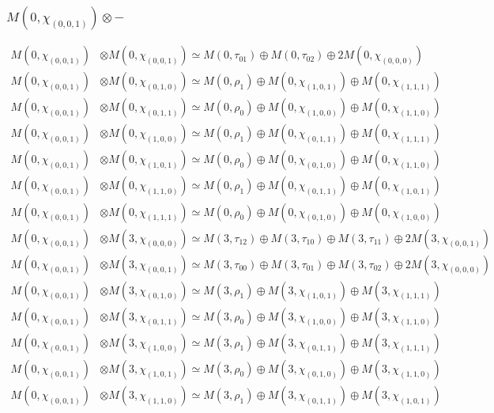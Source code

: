 \subsubsection{$ M(0,\chi_{(0,0,1)})\otimes -$}
\begin{align*}
M(0,\chi_{(0,0,1)}) &\otimes M(0,\chi_{(0,0,1)}) \simeq M(0,\tau_{01}) \oplus M(0,\tau_{02}) \oplus 2 M(0,\chi_{(0,0,0)}) \\
M(0,\chi_{(0,0,1)}) &\otimes M(0,\chi_{(0,1,0)}) \simeq M(0,\rho_{1}) \oplus M(0,\chi_{(1,0,1)}) \oplus M(0,\chi_{(1,1,1)}) \\
M(0,\chi_{(0,0,1)}) &\otimes M(0,\chi_{(0,1,1)}) \simeq M(0,\rho_{0}) \oplus M(0,\chi_{(1,0,0)}) \oplus M(0,\chi_{(1,1,0)}) \\
M(0,\chi_{(0,0,1)}) &\otimes M(0,\chi_{(1,0,0)}) \simeq M(0,\rho_{1}) \oplus M(0,\chi_{(0,1,1)}) \oplus M(0,\chi_{(1,1,1)}) \\
M(0,\chi_{(0,0,1)}) &\otimes M(0,\chi_{(1,0,1)}) \simeq M(0,\rho_{0}) \oplus M(0,\chi_{(0,1,0)}) \oplus M(0,\chi_{(1,1,0)}) \\
M(0,\chi_{(0,0,1)}) &\otimes M(0,\chi_{(1,1,0)}) \simeq M(0,\rho_{1}) \oplus M(0,\chi_{(0,1,1)}) \oplus M(0,\chi_{(1,0,1)}) \\
M(0,\chi_{(0,0,1)}) &\otimes M(0,\chi_{(1,1,1)}) \simeq M(0,\rho_{0}) \oplus M(0,\chi_{(0,1,0)}) \oplus M(0,\chi_{(1,0,0)}) \\
M(0,\chi_{(0,0,1)}) &\otimes M(3,\chi_{(0,0,0)}) \simeq M(3,\tau_{12}) \oplus M(3,\tau_{10}) \oplus M(3,\tau_{11}) \oplus 2 M(3,\chi_{(0,0,1)}) \\
M(0,\chi_{(0,0,1)}) &\otimes M(3,\chi_{(0,0,1)}) \simeq M(3,\tau_{00}) \oplus M(3,\tau_{01}) \oplus M(3,\tau_{02}) \oplus 2 M(3,\chi_{(0,0,0)}) \\
M(0,\chi_{(0,0,1)}) &\otimes M(3,\chi_{(0,1,0)}) \simeq M(3,\rho_{1}) \oplus M(3,\chi_{(1,0,1)}) \oplus M(3,\chi_{(1,1,1)}) \\
M(0,\chi_{(0,0,1)}) &\otimes M(3,\chi_{(0,1,1)}) \simeq M(3,\rho_{0}) \oplus M(3,\chi_{(1,0,0)}) \oplus M(3,\chi_{(1,1,0)}) \\
M(0,\chi_{(0,0,1)}) &\otimes M(3,\chi_{(1,0,0)}) \simeq M(3,\rho_{1}) \oplus M(3,\chi_{(0,1,1)}) \oplus M(3,\chi_{(1,1,1)}) \\
M(0,\chi_{(0,0,1)}) &\otimes M(3,\chi_{(1,0,1)}) \simeq M(3,\rho_{0}) \oplus M(3,\chi_{(0,1,0)}) \oplus M(3,\chi_{(1,1,0)}) \\
M(0,\chi_{(0,0,1)}) &\otimes M(3,\chi_{(1,1,0)}) \simeq M(3,\rho_{1}) \oplus M(3,\chi_{(0,1,1)}) \oplus M(3,\chi_{(1,0,1)}) \\

\end{align*}
